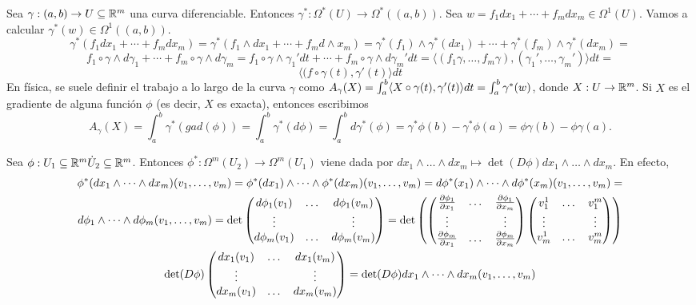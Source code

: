 \documentclass[CV.tex]{subfiles}
\begin{document}
\begin{ej}
Sea $\gamma:(a,b)\to U\subseteq\mathbb{R}^m$ una curva diferenciable. Entonces $\gamma^*:\Omega^*(U)\to\Omega^*((a,b))$. Sea $w=f_1dx_1+\cdots+f_m dx_m\in\Omega^1(U)$. Vamos a calcular $\gamma^*(w)\in\Omega^1((a,b))$.
\[
\gamma^*(f_1dx_1+\cdots+f_m dx_m)=\gamma^*(f_1\land dx_1+\cdots+f_m d\land x_m)=\gamma^*(f_1)\land\gamma^*(dx_1)+\cdots+\gamma^*(f_m)\land\gamma^*(dx_m)=
\]
\[
f_1\circ\gamma\land d\gamma_1+\cdots+f_m\circ\gamma\land d\gamma_m=f_1\circ\gamma\land \gamma_1'dt+\cdots+f_m\circ\gamma\land d\gamma_m'dt=\langle (f_1\gamma,\dots,f_m\gamma),(\gamma_1',\dots,\gamma_m')\rangle dt=
\]
\[
\langle (f\circ\gamma(t),\gamma'(t)\rangle dt
\]
En física, se suele definir el trabajo a lo largo de la curva $\gamma$ como $A_{\gamma}(X)=\int_a^b\langle{X\circ\gamma(t),\gamma'(t)}\rangle dt=\int_a^b\gamma^*(w)$, donde $X:U\to\mathbb{R}^m$. Si $X$ es el gradiente de alguna función $\phi$ (es decir, $X$ es exacta), entonces escribimos 
\[
A_{\gamma}(X)=\int_a^b\gamma^*(gad(\phi))=\int_a^b\gamma^*(d\phi)=\int_a^b d\gamma^*(\phi)=\gamma^*\phi(b)-\gamma^*\phi(a)=\phi\gamma(b)-\phi\gamma(a).
\]
\end{ej}
\begin{ej}
Sea $\phi:U_1\subseteq\mathbb{R}^m\dot U_2\subseteq\mathbb{R}^m$. Entonces $\phi^*:\Omega^m(U_2)\to\Omega^m(U_1)$ viene dada por $dx_1\land\dots\land dx_m\mapsto \det(D\phi)dx_1\land\dots\land dx_m$. En efecto,
\begin{gather*}
\phi^*(dx_1\land\dots\land dx_m)(v_1,\dots, v_m)=\phi^*(dx_1)\land\dots\land\phi^*(dx_m)(v_1,\dots,v_m)=d\phi^*(x_1)\land\dots\land d\phi^*(x_m)(v_1,\dots, v_m)=\\
d\phi_1\land\dots\land d\phi_m(v_1,\dots, v_m)=\det\begin{pmatrix}
d\phi_1(v_1) & \dots & d\phi_1(v_m)\\
\vdots & &\vdots\\
d\phi_m(v_1) & \dots & d\phi_m(v_m)
\end{pmatrix}=\det\left(\begin{pmatrix}
\frac{\partial \phi_1}{\partial x_1} &\dots & \frac{\partial \phi_1}{\partial x_m}\\
\vdots & & \vdots\\
\frac{\partial \phi_m}{\partial x_1} & \dots & \frac{\partial \phi_m}{\partial x_m}
\end{pmatrix}\begin{pmatrix}
v_1^1 & \dots & v^m_1\\
\vdots & & \vdots\\
v_m^1 & \dots & v^m_m
\end{pmatrix}\right)\\
\det(D\phi)\begin{pmatrix}
dx_1(v_1) & \dots & dx_1(v_m)\\
\vdots & & \vdots\\
dx_m(v_1) & \dots & dx_m(v_m)
\end{pmatrix}=\det(D\phi)dx_1\land\dots\land dx_m(v_1,\dots, v_m)
\end{gather*}
\end{ej}
\end{document}
